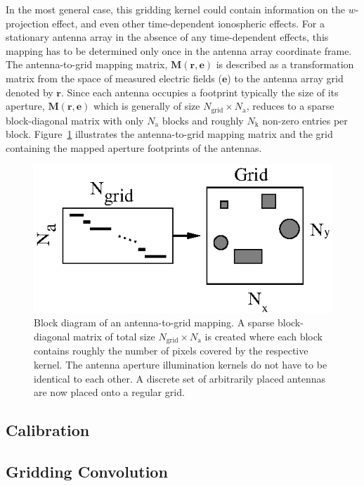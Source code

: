 \documentclass[a4paper,fleqn,usenatbib]{../mnras}
\begin{document}
In the most general case, this gridding kernel could contain information on the $w$-projection effect, and even other time-dependent ionospheric effects. For a stationary antenna array in the absence of any time-dependent effects, this mapping has to be determined only once in the antenna array coordinate frame. The antenna-to-grid mapping matrix, $\mathbf{M}(\mathbf{r},\mathbf{e})$ is described as a transformation matrix from the space of measured electric fields ($\mathbf{e}$) to the antenna array grid denoted by $\mathbf{r}$. Since each antenna occupies a footprint typically the size of its aperture, $\mathbf{M}(\mathbf{r},\mathbf{e})$ which is generally of size $N_\textrm{grid}\times N_\textrm{a}$, reduces to a sparse block-diagonal matrix with only $N_\textrm{a}$ blocks and roughly $N_\textrm{k}$ non-zero entries per block. Figure~\ref{fig:a2g-mapping} illustrates the antenna-to-grid mapping matrix and the grid containing the mapped aperture footprints of the antennas.

\begin{figure}
  \includegraphics[width=\columnwidth]{a2g_mapping.eps}
  \caption{Block diagram of an antenna-to-grid mapping. A sparse block-diagonal matrix of total size $N_\textrm{grid}\times N_\textrm{a}$ is created where each block contains roughly the number of pixels covered by the respective kernel. The antenna aperture illumination kernels do not have to be identical to each other. A discrete set of arbitrarily placed antennas are now placed onto a regular grid.}
  \label{fig:a2g-mapping}
\end{figure}

\subsection{Calibration}

\subsection{Gridding Convolution}
\end{document}

